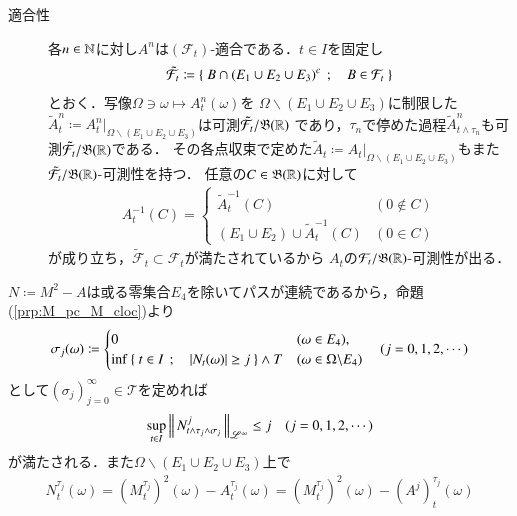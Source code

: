 \begin{prf}
\begin{description}
\begin{description}
					\item[適合性]
						各$n \in \mathbb{N}$に対し$A^n$は$(\mathcal{F}_t)$-適合である．$t \in I$を固定し
						\begin{align}
							\tilde{\mathcal{F}}_t \coloneqq \left\{\ B \cap (E_1 \cup E_2 \cup E_3)^c\ \, ; \quad B \in \mathcal{F}_t\ \right\}
						\end{align}
						とおく．写像$\Omega \ni \omega \longmapsto A_t^n(\omega)$を
						$\Omega \backslash (E_1 \cup E_2 \cup E_3)$に制限した
						$\tilde{A}_t^n \coloneqq A_t^n|_{\Omega \backslash (E_1 \cup E_2 \cup E_3)}$は可測$\tilde{\mathcal{F}}_t/\mathfrak{B}(\mathbb{R})$
						であり，$\tau_n$で停めた過程$\tilde{A}_{t \wedge \tau_n}^n$も可測$\tilde{\mathcal{F}}_t/\mathfrak{B}(\mathbb{R})$である．
						その各点収束で定めた$\tilde{A}_t \coloneqq A_t|_{\Omega \backslash (E_1 \cup E_2 \cup E_3)}$もまた$\tilde{\mathcal{F}}_t/\mathfrak{B}(\mathbb{R})$-可測性を持つ．
						任意の$C \in \mathfrak{B}(\mathbb{R})$に対して
						\begin{align}
							A_t^{-1}(C) =
							\begin{cases}
								\tilde{A}_t^{-1}(C) & (0 \notin C) \\
								(E_1 \cup E_2) \cup \tilde{A}_t^{-1}(C) & (0 \in C)
							\end{cases}
						\end{align}
						が成り立ち，$\tilde{\mathcal{F}}_t \subset \mathcal{F}_t$が満たされているから
						$A_t$の$\mathcal{F}_t/\mathfrak{B}(\mathbb{R})$-可測性が出る．
				\end{description}
				$N \coloneqq M^2 - A$は或る零集合$E_4$を除いてパスが連続であるから，命題(\ref{prp:M_pc_M_cloc})より
				\begin{align}
					\sigma_j(\omega) \coloneqq
					\begin{cases}
						0 & (\omega \in E_4), \\
						\operatorname*{inf}_{} \left\{\ t \in I\ \, ; \quad |N_t(\omega)| \geq j\ \right\} \wedge T & (\omega \in \Omega \backslash E_4)
					\end{cases}
					\quad (j=0,1,2,\cdots)
				\end{align}
				として$(\sigma_j)_{j=0}^{\infty} \in \mathcal{T}$を定めれば
				\begin{align}
					\operatorname*{sup}_{t \in I}  \left\|\, N_{t \wedge \tau_j \wedge \sigma_j}^j\, \right\|_{\mathscr{L}^\infty}  \leq j
					\quad (j = 0,1,2,\cdots)
				\end{align}
				が満たされる．また$\Omega \backslash (E_1 \cup E_2 \cup E_3)$上で
				\begin{align}
					N_t^{\tau_j}(\omega) = \left( M_t^{\tau_j} \right)^2(\omega) - A_t^{\tau_j}(\omega) 
				= \left( M_t^{\tau_j} \right)^2(\omega) - \left( A^j \right)_t^{\tau_j}(\omega)

\end{align}
\end{description}
\end{prf}

